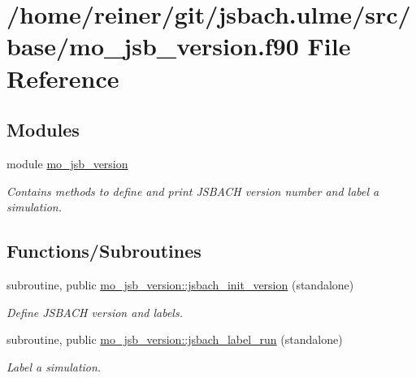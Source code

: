 \hypertarget{mo__jsb__version_8f90}{}\section{/home/reiner/git/jsbach.ulme/src/base/mo\+\_\+jsb\+\_\+version.f90 File Reference}
\label{mo__jsb__version_8f90}
\subsection*{Modules}
\begin{DoxyCompactItemize}
\item 
module \hyperlink{namespacemo__jsb__version}{mo\+\_\+jsb\+\_\+version}
\begin{DoxyCompactList}\small\item\em Contains methods to define and print J\+S\+B\+A\+C\+H version number and label a simulation. \end{DoxyCompactList}\end{DoxyCompactItemize}
\subsection*{Functions/\+Subroutines}
\begin{DoxyCompactItemize}
\item 
subroutine, public \hyperlink{namespacemo__jsb__version_ab847bc6225ad7fa0b42380b0a4efd458}{mo\+\_\+jsb\+\_\+version\+::jsbach\+\_\+init\+\_\+version} (standalone)
\begin{DoxyCompactList}\small\item\em Define J\+S\+B\+A\+C\+H version and labels. \end{DoxyCompactList}\item 
subroutine, public \hyperlink{namespacemo__jsb__version_a7fd0292d048178f3a31599a2a7eff6fb}{mo\+\_\+jsb\+\_\+version\+::jsbach\+\_\+label\+\_\+run} (standalone)
\begin{DoxyCompactList}\small\item\em Label a simulation. \end{DoxyCompactList}\end{DoxyCompactItemize}
